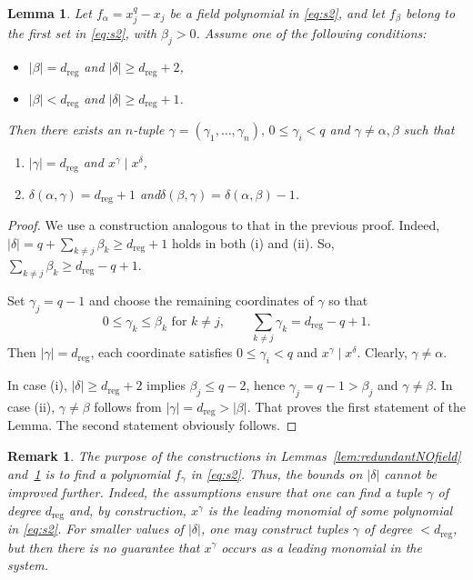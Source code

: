 \documentclass[a4paper, 12pt, oneside, openright]{article}
\newtheorem{lemma}{Lemma}
\newtheorem{remark}{Remark}
\begin{document}
\begin{lemma}\label{lem:redundantField}
Let $f_\alpha=x_j^q-x_j$ be a field polynomial in \eqref{eq:s2}, and let $f_\beta$ belong to the first set in \eqref{eq:s2}, with $\beta_j>0$. Assume one of the following conditions:
\begin{itemize}
    \item[(i)] $|\beta|=d_{\mathrm{reg}}$
    and $|\delta|\ge d_{\mathrm{reg}}+2$,
    \item[(ii)] $|\beta|<d_{\mathrm{reg}}$
    and $|\delta|\ge d_{\mathrm{reg}}+1$.
\end{itemize}
Then there exists an $n$-tuple $\gamma=(\gamma_1,\ldots,\gamma_n), \,0\le\gamma_i<q$ and $\gamma\neq\alpha,\beta$ such that 
\begin{enumerate}
\item $|\gamma|=d_{\mathrm{reg}}$ and $x^\gamma \mid x^\delta$,
\item $\delta(\alpha,\gamma)=d_{\mathrm{reg}}+1$ and\quad $\delta(\beta,\gamma)=\delta(\alpha,\beta)-1$.   
\end{enumerate}

\end{lemma}
\begin{proof}
We use a construction analogous to that in the previous proof. Indeed, $|\delta|=q+\sum_{k\ne j}\beta_k\geq d_{\mathrm{reg}}+1$  holds in both (i) and (ii). So, $\sum_{k\ne j}\beta_k\geq d_{\mathrm{reg}}-q+1$.

Set $\gamma_j=q-1$ and choose the remaining coordinates of $\gamma$ so that 
\[
0\le \gamma_k\le\beta_k \text{ for }k\neq j, \qquad \sum_{k\ne j}\gamma_k=d_{\mathrm{reg}}-q+1.
\]
Then $|\gamma|=d_{\mathrm{reg}}$, each coordinate satisfies $0\le\gamma_i<q$ and $x^\gamma\mid x^\delta$.
Clearly, $\gamma\ne\alpha$.

In case (i), $|\delta|\ge d_{\mathrm{reg}}+2$ implies $\beta_j\le q-2$, hence $\gamma_j=q-1>\beta_j$ and $\gamma\ne\beta$.
In case (ii), $\gamma\ne\beta$ follows from $|\gamma|=d_{\mathrm{reg}}>|\beta|$. That proves the first statement of the Lemma. The second statement obviously follows.
\end{proof}


\begin{remark}
The purpose of the constructions in Lemmas~\ref{lem:redundantNOfield} and~\ref{lem:redundantField} is to find a polynomial $f_\gamma$ in \eqref{eq:s2}.
Thus, the bounds on $|\delta|$ cannot be improved further.
Indeed, the assumptions ensure that one can find a tuple $\gamma$ of degree $d_{\mathrm{reg}}$ and, by construction, $x^\gamma$ is the leading monomial of some polynomial in \eqref{eq:s2}.
For smaller values of $|\delta|$, one may construct tuples $\gamma$ of degree $<d_{\mathrm{reg}}$, but then there is no guarantee that $x^\gamma$ occurs as a leading monomial in the system.
\end{remark}
\end{document}

